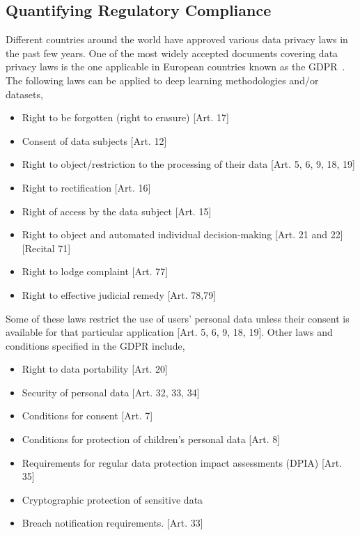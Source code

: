 \documentclass[journal]{IEEEtran}
\begin{document}


\subsection{Quantifying Regulatory Compliance} Different countries around the world have approved various data privacy laws in the past few years. One of the most widely accepted documents covering data privacy laws is the one applicable in European countries known as the GDPR~\cite{regulation2016regulation}. The following laws can be applied to deep learning methodologies and/or datasets,
\begin{itemize}
    \item Right to be forgotten (right to erasure) [Art. 17]
    \item Consent of data subjects [Art. 12]
    \item Right to object/restriction to the processing of their data [Art. 5, 6, 9, 18, 19]
    \item Right to rectification [Art. 16]
    \item Right of access by the data subject [Art. 15]
    \item Right to object and automated individual decision-making [Art. 21 and 22] [Recital 71]
    \item Right to lodge complaint [Art. 77]
    \item Right to effective judicial remedy [Art. 78,79]
\end{itemize}
\noindent Some of these laws restrict the use of users' personal data unless their consent is available for that particular application [Art. 5, 6, 9, 18, 19]. Other laws and conditions specified in the GDPR include,
\begin{itemize}
    \item Right to data portability [Art. 20]
    \item Security of personal data [Art. 32, 33, 34]
    \item Conditions for consent [Art. 7]
    \item Conditions for protection of children's personal data [Art. 8]
    \item Requirements for regular data protection impact assessments (DPIA) [Art. 35]
    \item Cryptographic protection of sensitive data  
    \item Breach notification requirements. [Art. 33]
\end{itemize}
\end{document}
